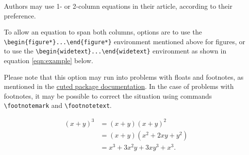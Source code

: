 \documentclass[9pt,twocolumn,twoside,printwatermark=true]{pinp}
\begin{document}
Authors may use 1- or 2-column equations in their article, according to
their preference.

To allow an equation to span both columns, options are to use the
\texttt{\textbackslash{}begin\{figure*\}...\textbackslash{}end\{figure*\}}
environment mentioned above for figures, or to use the
\texttt{\textbackslash{}begin\{widetext\}...\textbackslash{}end\{widetext\}}
environment as shown in equation \ref{eqn:example} below.

Please note that this option may run into problems with floats and
footnotes, as mentioned in the \href{http://texdoc.net/pkg/cuted}{cuted
package documentation}. In the case of problems with footnotes, it may
be possible to correct the situation using commands
\texttt{\textbackslash{}footnotemark} and
\texttt{\textbackslash{}footnotetext}.

\begin{equation}
  \begin{aligned}
(x+y)^3&=(x+y)(x+y)^2\\
       &=(x+y)(x^2+2xy+y^2) \\
       &=x^3+3x^2y+3xy^3+x^3. 
       \label{eqn:example} 
  \end{aligned}
\end{equation}

\showacknow




\end{document}
